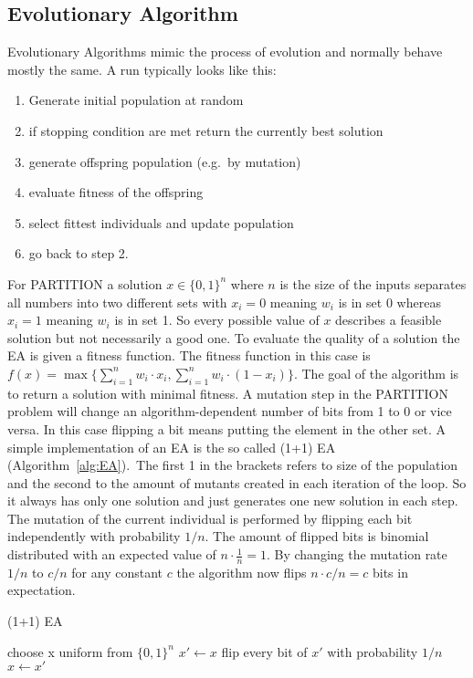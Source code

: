\subsection{Evolutionary Algorithm}
Evolutionary Algorithms mimic the process of evolution and normally behave mostly the same.
A run typically looks like this:
\begin{enumerate}
      \item Generate initial population at random
      \item if stopping condition are met return the currently best solution
      \item generate offspring population (e.g.\ by mutation)
      \item evaluate fitness of the offspring
      \item select fittest individuals and update population
      \item go back to step 2.
\end{enumerate}
For PARTITION a solution $x\in{\{0,1\}}^{n}$ where $n$ is the size of the inputs separates all numbers into two different sets with $x_i=0$ meaning $w_i$ is in set 0 whereas $x_i=1$ meaning $w_i$ is in set 1.
So every possible value of $x$ describes a feasible solution but not necessarily a good one.
To evaluate the quality of a solution the EA is given a fitness function.
The fitness function in this case is \(f(x)=\max\{\sum_{i=1}^{n}w_i\cdot x_i, \sum_{i=1}^{n}w_i\cdot(1-x_i)\}\).
The goal of the algorithm is to return a solution with minimal fitness.
A mutation step in the PARTITION problem will change an algorithm-dependent number of bits from 1 to 0 or vice versa.
In this case flipping a bit means putting the element in the other set.
A simple implementation of an EA is the so called (1+1) EA (Algorithm~\ref{alg:EA}).\
The first 1 in the brackets refers to size of the population and the second to the amount of mutants created in each iteration of the loop.
So it always has only one solution and just generates one new solution in each step.
The mutation of the current individual is performed by flipping each bit independently with probability $1/n$.
The amount of flipped bits is binomial distributed with an expected value of $n\cdot\frac{1}{n}=1$.
By changing the mutation rate $1/n$ to $c/n$ for any constant $c$ the algorithm now flips $n\cdot c/n=c$ bits in expectation.\newline
\begin{algorithm}[bt]
      \caption{\textsc{(1+1) EA}}\label{alg:EA}

      \DontPrintSemicolon %

      \BlankLine
      choose x uniform from ${\{0,1\}}^n$\;
      {
      $x' \leftarrow x$\;
      flip every bit of $x'$ with probability $1/n$\;
      {
      {
            $x \leftarrow x'$\;
      }
      }
      }
\end{algorithm}

